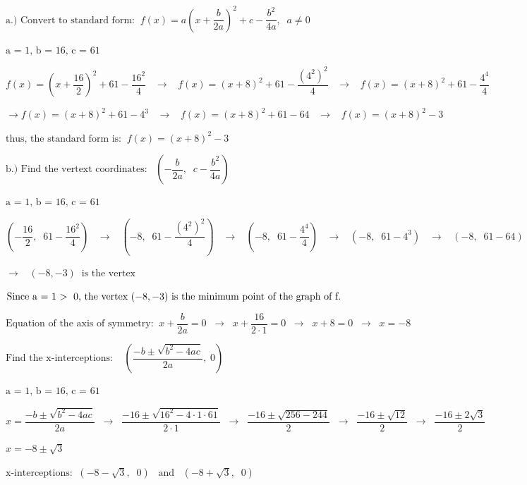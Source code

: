 \documentclass[12pt]{article}
\begin{document}
$\text{a.) Convert to standard form:} \;\; f(x) = a\left(x + \dfrac{b}{2a}\right)^2 + c - \dfrac{b^2}{4a}, \;\; a \neq 0$

$\text{a = 1, b = 16, c = 61}$

$f(x) = \left(x + \dfrac{16}{2}\right)^2 + 61 - \dfrac{16^2}{4} \;\;\; \rightarrow \;\;\; f(x) = \left(x + 8 \right)^2 + 61 - \dfrac{(4^2)^2}{4} \;\;\; \rightarrow \;\;\; f(x) = \left(x + 8 \right)^2 + 61 - \dfrac{4^4}{4}$

$\rightarrow f(x) = \left(x + 8 \right)^2 + 61 - 4^3 \;\;\; \rightarrow \;\;\; f(x) = \left(x + 8 \right)^2 + 61 - 64 \;\;\; \rightarrow \;\;\; f(x) = \left(x + 8 \right)^2 -3$

$\text{thus, the standard form is:} \;\; f(x) = \left(x + 8 \right)^2 -3$

$\text{b.) Find the vertext coordinates:} \;\;\; \left(-\dfrac{b}{2a}, \;\; c - \dfrac{b^2}{4a} \right)$

$\text{a = 1, b = 16, c = 61}$

$\left(-\dfrac{16}{2}, \;\; 61 - \dfrac{16^2}{4} \right) \;\;\; \rightarrow \;\;\; \left(-8, \;\; 61 - \dfrac{(4^2)^2}{4} \right) \;\;\; \rightarrow \;\;\; \left(-8, \;\; 61 - \dfrac{4^4}{4} \right) \;\;\; \rightarrow \;\;\; \left(-8, \;\; 61 - 4^3 \right) \;\;\; \rightarrow \;\;\; \left(-8, \;\; 61 - 64 \right)$

$ \rightarrow \;\;\; \left(-8, -3 \right) \;\; \text{is the vertex}$

$\text{Since a = 1 $>$ \;0, the vertex $\left(-8, -3 \right)$ is the minimum point of the graph of f.}$

$\text{Equation of the axis of symmetry:} \;\; x + \dfrac{b}{2a} = 0 \;\; \rightarrow \;\; x + \dfrac{16}{2 \cdot 1} = 0 \;\; \rightarrow \;\; x + 8 = 0 \;\; \rightarrow \;\; x = -8$

$\text{Find the x-interceptions:} \;\; \;\; \left(\dfrac{-b \pm \sqrt{b^2 - 4ac}}{2a},\; 0 \right)$

$\text{a = 1, b = 16, c = 61}$

$ x = \dfrac{-b \pm \sqrt{b^2 - 4ac}}{2a} \;\; \rightarrow \;\; \dfrac{-16 \pm \sqrt{16^2 - 4 \cdot 1 \cdot 61}}{2 \cdot 1} \;\; \rightarrow \;\; \dfrac{-16 \pm \sqrt{256 - 244}}{2} \;\; \rightarrow \;\; \dfrac{-16 \pm \sqrt{12}}{2} \;\; \rightarrow \;\; \dfrac{-16 \pm 2\sqrt{3}}{2}$

$x = -8 \pm \sqrt{3}$

$\text{x-interceptions:} \;\; \left(-8 - \sqrt{3}, \;\; 0 \right) \;\;\; \text{and} \;\;\; \left(-8 + \sqrt{3}, \;\; 0 \right)$
\end{document}

